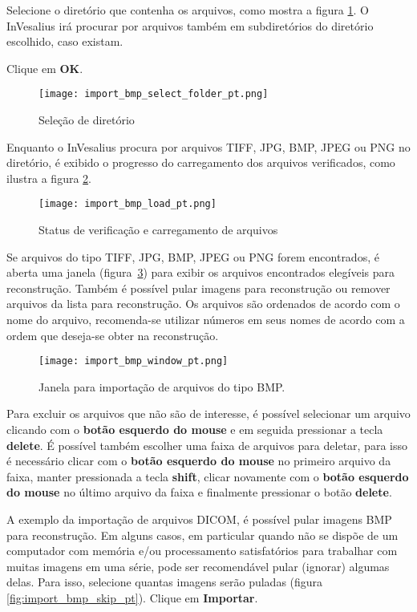 Selecione o diretório que contenha os arquivos, como mostra a figura \ref{fig:import_bmp_select_folder}. O InVesalius irá procurar por arquivos também em subdiretórios do diretório escolhido, caso existam.

Clique em \textbf{OK}.

\begin{figure}[!htb]
\centering
\texttt{[image: import\_bmp\_select\_folder\_pt.png]}
\caption{Seleção de diretório}
\label{fig:import_bmp_select_folder}
\end{figure}


Enquanto o InVesalius procura por arquivos TIFF, JPG, BMP, JPEG ou PNG no diretório, é exibido o progresso do carregamento dos arquivos verificados, como ilustra a figura \ref{fig:import_bmp_load_pt}.

\begin{figure}[!htb]
\centering
\texttt{[image: import\_bmp\_load\_pt.png]}
\caption{Status de verificação e carregamento de arquivos}
\label{fig:import_bmp_load_pt}
\end{figure}


Se arquivos do tipo TIFF, JPG, BMP, JPEG ou PNG  forem encontrados, é aberta uma janela (figura~\ref{fig:import_bmp_window_pt}) para exibir os arquivos encontrados elegíveis para reconstrução. Também é possível pular imagens para reconstrução ou remover arquivos da lista para reconstrução. Os arquivos são ordenados de acordo com o nome do arquivo, recomenda-se utilizar números em seus nomes de acordo com a ordem que deseja-se obter na reconstrução.

\begin{figure}[!htb]
\centering
\texttt{[image: import\_bmp\_window\_pt.png]}
\caption{Janela para importação de arquivos do tipo BMP.}
\label{fig:import_bmp_window_pt}
\end{figure}

Para excluir os arquivos que não são de interesse, é possível selecionar um arquivo clicando com o \textbf{botão esquerdo do mouse} e em seguida pressionar a tecla \textbf{delete}. É possível também escolher uma faixa de arquivos para deletar, para isso é necessário clicar com o \textbf{botão esquerdo do mouse} no primeiro arquivo da faixa, manter pressionada a tecla \textbf{shift}, clicar novamente com o \textbf{botão esquerdo do mouse} no último arquivo da faixa e finalmente pressionar o botão \textbf{delete}.
 
A exemplo da importação de arquivos DICOM, é possível pular imagens BMP para reconstrução. Em alguns casos, em particular quando não se dispõe de um computador com memória e/ou processamento satisfatórios para trabalhar com muitas imagens em uma série, pode ser recomendável pular (ignorar) algumas delas. Para isso, selecione quantas imagens serão puladas (figura \ref{fig:import_bmp_skip_pt}). Clique em \textbf{Importar}.

